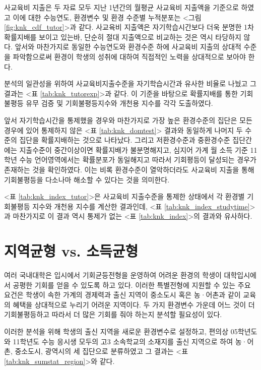 사교육비 지출은 두 자료 모두 지난 1년간의 월평균 사교육비 지출액을 기준으로 하였고 이에 대한 수능연도, 환경변수 및 환경 수준별 누적분포는 <그림 \ref{fig:knk_cdf_tutor}>과 같다.
사교육비 지출액은 자기학습시간보다 더욱 분명한 1차 확률지배를 보이고 있는바, 단순히 절대 지출액으로 비교하는 것은 역시 타당하지 않다.
 앞서와 마찬가지로 동일한 수능연도와 환경수준 하에 사교육비 지출의 상대적 수준을 파악함으로써 환경이 학생의 성취에 대하여 직접적인 노력을 상대적으로 보아야 한다.



분석의 일관성을 위하여 사교육비지출수준을 자기학습시간과 유사한 비율로 나눴고 그 결과는 <표 \ref{tab:knk_tutorexp}>과 같다.
이 기준을 바탕으로 확률지배를 통한 기회불평등 유무 검증 및 기회불평등지수와 개천용 지수를 각각 도출하였다. 



앞서 자기학습시간을 통제했을 경우와 마찬가지로 가장 높은 환경수준의 집단은 모든 경우에 있어 통제하지 않은 <표 \ref{tab:knk_domtest}> 결과와 동일하게 나머지 두 수준의 집단을 확률지배하는 것으로 나타났다.
그리고 저환경수준과 중환경수준 집단간에는 지출수준이 중간이상이면 확률지배가 불분명해지고, 심지어 가계 월 소득 기준 11학년 수능 언어영역에서는 확률분포가 동일해지고 따라서 기회평등이 달성되는 경우가 존재하는 것을 확인하였다.
 이는 비록 환경수준이 열악하더라도 사교육비 지출을 통해 기회불평등을 다소나마 해소할 수 있다는 것을 의미한다.
 
<표 \ref{tab:knk_index_tutor}>은 사교육비 지출수준을 통제한 상태에서 각 환경별 기회불평등 지수와 개천용 지수를 계산한 결과인데, <표 \ref{tab:knk_index_studytime}>과 마찬가지로 이 결과 역시 통제가 없는 <표 \ref{tab:knk_index}>의 결과와 유사하다. 



\section{지역균형 vs. 소득균형}

여러 국내대학은 입시에서 기회균등전형을 운영하여 어려운 환경의 학생이 대학입시에서 공평한 기회를 얻을 수 있도록 하고 있다.
이러한 특별전형에 지원할 수 있는 주요 요건은 학생이 속한 가계의 경제력과 출신 지역이 중소도시 혹은 농·어촌과 같이 교육의 혜택을 상대적으로 누리기 어려운 지역이다.
 두 가지 환경변수 가운데 어느 것이 더 기회불평등하고 따라서 더 많은 기회를 줘야 하는지 분석할 필요성이 있다.

이러한 분석을 위해 학생의 출신 지역을 새로운 환경변수로 설정하고, 편의상 05학년도와 11학년도 수능 응시생 모두의 고3 소속학교의 소재지를 출신 지역으로 하여 농·어촌, 중소도시, 광역시의 세 집단으로 분류하였고 그 결과는 <표 \ref{tab:knk_sumstat_region}>와 같다.

